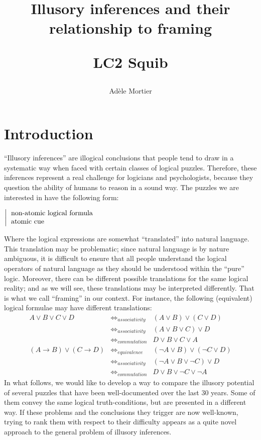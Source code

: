 \documentclass[french]{article}
\title{Illusory inferences and their relationship to framing \\  \begin{large}
		LC2 Squib
\end{large}}
\author{Adèle Mortier}
\begin{document}
	\nocite{*}
\maketitle
\section{Introduction}
``Illusory inferences'' \cite{johnsonlaird1999} are illogical conclusions that people tend to draw in a systematic way when faced with certain classes of logical puzzles. Therefore, these inferences represent a real challenge for logicians and psychologists, because they question the ability of humans to reason in a sound way. The puzzles we are interested in have the following form:
\begin{center}
	$\left |
	\begin{tabular}{l}
	non-atomic logical formula\\
	atomic cue
\end{tabular}\right.$
\end{center}
Where the logical expressions are somewhat ``translated'' into natural language. This translation may be problematic; since natural language is by nature ambiguous, it is difficult to ensure that all people understand the logical operators of natural language as they should be understood within the ``pure'' logic. Moreover, there can be different possible translations for the same logical reality; and as we will see, these translations may be interpreted differently. That is what we call ``framing'' in our context. For instance, the following (equivalent) logical formulae may have different translations:
\begin{eqnarray*}
A \vee B \vee C \vee D &\iff_{associativity}& (A \vee B) \vee (C \vee D)\\ &\iff_{associativity}& (A \vee B \vee C) \vee D \\ &\iff_{commutation}& D \vee B \vee C \vee A \\
(A \rightarrow B) \vee (C \rightarrow D) &\iff_{equivalence}& (\neg A \vee B) \vee (\neg C \vee D) \\ &\iff_{associativity}& (\neg A \vee B \vee \neg C) \vee D\\ &\iff_{commutation}& D \vee B \vee \neg C \vee \neg A
\end{eqnarray*}
In what follows, we would like to develop a way to compare the illusory potential of several puzzles that have been well-documented over the last 30 years. Some of them convey the same logical truth-conditions, but are presented in a different way. If these problems and the conclusions they trigger are now well-known, trying to rank them with respect to their difficulty appears as a quite novel approach to the general problem of illusory inferences.
\end{document}

